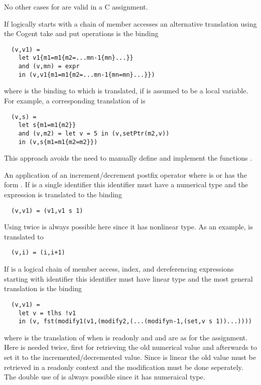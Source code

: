 No other cases for  are valid in a C assignment.

If  logically starts with a chain of member accesses  an alternative translation using the Cogent
take and put operations is the binding
\begin{verbatim}
  (v,v1) = 
    let v1{m1=m1{m2=...mn-1{mn}...}}
    and (v,mn) = expr
    in (v,v1{m1=m1{m2=...mn-1{mn=mn}...}})
\end{verbatim}
where  is the binding to which  is translated, if  is assumed to be a local variable. 
For example, a corresponding translation of  is
\begin{verbatim}
  (v,s) = 
    let s{m1=m1{m2}}
    and (v,m2) = let v = 5 in (v,setPtr(m2,v))
    in (v,s{m1=m1{m2=m2}})
\end{verbatim}
This approach avoids the need to manually define and implement the functions .

An application of an increment/decrement postfix operator  where  is \code{+} or \code{-} has the form
. If  is a single identifier  this identifier must have a numerical type and the expression 
is translated to the binding
\begin{verbatim}
  (v,v1) = (v1,v1 s 1)
\end{verbatim}
Using  twice is always possible here since it has nonlinear type. As an example,  is translated to
\begin{verbatim}
  (v,i) = (i,i+1)
\end{verbatim}

If  is a logical chain of  member access, index, and dereferencing expressions starting with identifier 
this identifier must have linear type and the most general translation is the binding
\begin{verbatim}
  (v,v1) = 
    let v = tlhs !v1
    in (v, fst(modify1(v1,(modify2,(...(modifyn-1,(set,v s 1))...))))
\end{verbatim}
where  is the translation of  when  is readonly and  and  are as 
for the assignment. Here  is needed twice, first for retrieving the old
numerical value  and afterwards to set it to the incremented/decremented value. Since  is linear the old
value must be retrieved in a readonly context and the modification must be done seperately. The double use of 
is always possible since it has numeraical type.

